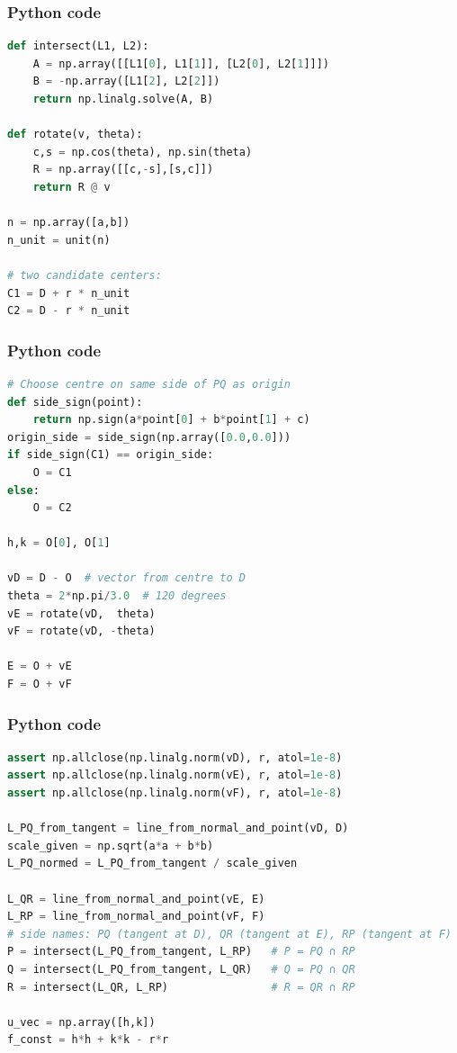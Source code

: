 \documentclass{beamer}
\begin{document}
\begin{frame}[fragile]
    \frametitle{Python code}
    \begin{lstlisting}[language=Python]
def intersect(L1, L2):
    A = np.array([[L1[0], L1[1]], [L2[0], L2[1]]])
    B = -np.array([L1[2], L2[2]])
    return np.linalg.solve(A, B)

def rotate(v, theta):
    c,s = np.cos(theta), np.sin(theta)
    R = np.array([[c,-s],[s,c]])
    return R @ v

n = np.array([a,b])
n_unit = unit(n)

# two candidate centers:
C1 = D + r * n_unit
C2 = D - r * n_unit
    \end{lstlisting}   
\end{frame}

\begin{frame}[fragile]
    \frametitle{Python code}
    \begin{lstlisting}[language=Python]
# Choose centre on same side of PQ as origin
def side_sign(point):
    return np.sign(a*point[0] + b*point[1] + c)
origin_side = side_sign(np.array([0.0,0.0]))
if side_sign(C1) == origin_side:
    O = C1
else:
    O = C2

h,k = O[0], O[1]

vD = D - O  # vector from centre to D
theta = 2*np.pi/3.0  # 120 degrees
vE = rotate(vD,  theta)
vF = rotate(vD, -theta)

E = O + vE
F = O + vF

    \end{lstlisting}   
\end{frame}

\begin{frame}[fragile]
    \frametitle{Python code}
    \begin{lstlisting}[language=Python]
assert np.allclose(np.linalg.norm(vD), r, atol=1e-8)
assert np.allclose(np.linalg.norm(vE), r, atol=1e-8)
assert np.allclose(np.linalg.norm(vF), r, atol=1e-8)

L_PQ_from_tangent = line_from_normal_and_point(vD, D)
scale_given = np.sqrt(a*a + b*b)
L_PQ_normed = L_PQ_from_tangent / scale_given

L_QR = line_from_normal_and_point(vE, E)
L_RP = line_from_normal_and_point(vF, F)
# side names: PQ (tangent at D), QR (tangent at E), RP (tangent at F)
P = intersect(L_PQ_from_tangent, L_RP)   # P = PQ ∩ RP
Q = intersect(L_PQ_from_tangent, L_QR)   # Q = PQ ∩ QR
R = intersect(L_QR, L_RP)                # R = QR ∩ RP

u_vec = np.array([h,k])
f_const = h*h + k*k - r*r

    \end{lstlisting}   
\end{frame}
\end{document}
